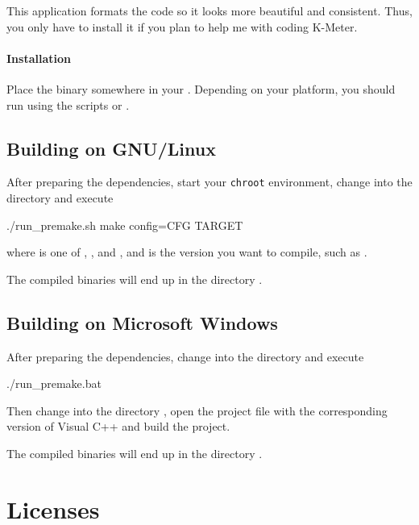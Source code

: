 This application formats the code so it looks more beautiful and
consistent.  Thus, you only have to install it if you plan to help me
with coding K-Meter.

\subsubsection{Installation}

Place the binary somewhere in your .  Depending on your
platform, you should run  using the scripts
 or .

\section{Building on GNU/Linux}

After preparing the dependencies, start your \texttt{chroot}
environment, change into the directory  and execute

\begin{VerbatimBoth}
  ./run_premake.sh
  make config=CFG TARGET
\end{VerbatimBoth}

where  is one of ,
,  and
, and  is the version
you want to compile, such as .

The compiled binaries will end up in the directory .

\section{Building on Microsoft Windows}

After preparing the dependencies, change into the directory
 and execute

\begin{VerbatimBoth}
  ./run_premake.bat
\end{VerbatimBoth}

Then change into the directory , open the
project file with the corresponding version of Visual C++ and build
the project.

The compiled binaries will end up in the directory .

\chapter{Licenses}

\scriptsize

\normalsize

\scriptsize

\normalsize




